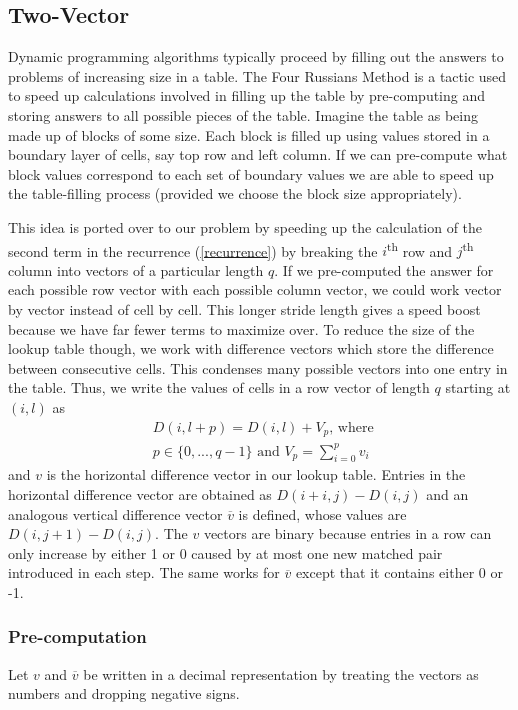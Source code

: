 \documentclass[journal]{IEEEtran}
\begin{document}
\subsection{Two-Vector}

Dynamic programming algorithms typically proceed by filling out the answers to problems of increasing size in a table. The Four Russians Method is a tactic used to speed up calculations involved in filling up the table by pre-computing and storing answers to all possible pieces of the table. Imagine the table as being made up of blocks of some size. Each block is filled up using values stored in a boundary layer of cells, say top row and left column. If we can pre-compute what block values correspond to each set of boundary values we are able to speed up the table-filling process (provided we choose the block size appropriately).

This idea is ported over to our problem by speeding up the calculation of the second term in the recurrence (\ref{recurrence}) by breaking the $i$\textsuperscript{th} row and $j$\textsuperscript{th} column into vectors of a particular length $q$. If we pre-computed the answer for each possible row vector with each possible column vector,  we could work vector by vector instead of cell by cell. This longer stride length gives a speed boost because we have far fewer terms to maximize over. To reduce the size of the lookup table though, we work with difference vectors which store the difference between consecutive cells. This condenses many possible vectors into one entry in the table. Thus, we write the values of cells in a row vector of length $q$ starting at $(i,l)$ as
\[
\begin{array}{rl}

&D(i,l+p) = D(i,l) + V_p\text{, where }\\
&p\in \lbrace 0,...,q-1\rbrace\text{ and }V_p = \sum\limits_{i=0}^p v_i
\end{array}
\]
and $v$ is the horizontal difference vector in our lookup table. Entries in the horizontal difference vector are obtained as $D(i+i,j)-D(i,j)$ and an analogous vertical difference vector $\overline{v}$ is defined, whose values are $D(i,j+1)-D(i,j)$. The $v$ vectors are binary because entries in a row can only increase by either 1 or 0 caused by at most one new matched pair introduced in each step. The same works for $\overline{v}$ except that it contains either 0 or -1.

\subsubsection{Pre-computation}
Let $v$ and $\overline{v}$ be written in a decimal representation by treating the vectors as numbers and dropping negative signs.
\end{document}
